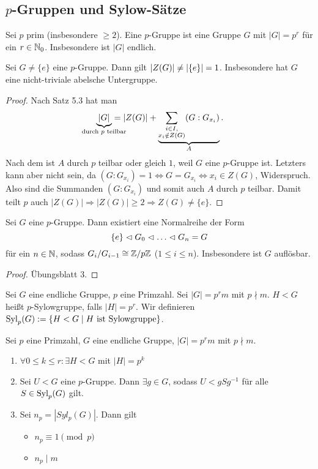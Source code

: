 \documentclass[12pt,a4paper]{scrartcl}
\begin{document}
\subsection{\texorpdfstring{$p$}{p}-Gruppen und Sylow-Sätze}
\begin{defi}
	Sei $p$ prim (insbesondere $\geq 2$). Eine $p$-Gruppe ist eine Gruppe $G$ mit $|G| = p^r$ für ein $r\in\IN_0$. Insbesondere ist $|G|$ endlich.
\end{defi}
\begin{satz}
	Sei $G\neq\{e\}$ eine $p$-Gruppe. Dann gilt $\abs{Z(G)}\neq \abs*{\{e\}} = 1$. Insbesondere hat $G$ eine nicht-triviale abelsche Untergruppe.
\end{satz}
\begin{proof}
	Nach Satz 5.3 hat man \[ \underbrace{|G|}_{\mathclap{\text{durch $p$ teilbar}}}  = |Z(G)| + \underbrace{\sum_{\substack{i\in I,\\x_i\notin Z(G)}}(G: G_{x_i})}_{A}.\] Nach dem  ist $A$ durch $p$ teilbar oder gleich $1$, weil $G$ eine $p$-Gruppe ist. Letzters kann aber nicht sein, da $(G:G_{x_i}) = 1 \Leftrightarrow G = G_{x_i}\Leftrightarrow x_i\in Z(G)$, Widerspruch. Also sind die Summanden $(G:G_{x_i})$ und somit auch $A$ durch $p$ teilbar. Damit teilt $p$ auch $|Z(G)|\Rightarrow |Z(G)|\geq 2\Rightarrow Z(G)\neq \{e\}$.
\end{proof}

\begin{satz}
	Sei $G$ eine $p$-Gruppe. Dann existiert eine Normalreihe der Form
	$$ \{e\}\nt G_0\nt\dots\nt G_n = G$$ für ein $n\in\IN$, sodass $G_i/G_{i-1}\cong \IZ/p\IZ$ \textup($1\le i\le n$\textup).
	Insbesondere ist $G$ auflösbar.
\end{satz}
\begin{proof}
	Übungsblatt 3.
\end{proof}

\begin{defi}
	Sei $G$ eine endliche Gruppe, $p$ eine Primzahl. Sei $|G| = p^rm$ mit $p\nmid m$. $H<G$ heißt $p$-Sylowgruppe, falls $|H| = p^r$. Wir definieren  $\Syl_p(G):=\{H<G\mid H\text{ ist Sylowgruppe}\}$.
\end{defi}

\begin{satz}[Sylowsätze] \label{thm:sylow}
	Sei $p$ eine Primzahl, $G$ eine endliche Gruppe, $|G| = p^rm$ mit $p\nmid m$.\begin{enumerate}
		\item $\forall 0\le k\le r \colon\exists H<G$ mit $|H| = p^k$
		\item Sei $U<G$ eine $p$-Gruppe. Dann $\exists g\in G$, sodass $U<gSg^{-1}$ für alle $S\in \Syl_p(G)$ gilt.
		\item Sei $n_p = |Syl_p(G)|$. Dann gilt \begin{itemize}
			\item $n_p\equiv 1\pmod p$
			\item $n_p\mid m$
		\end{itemize}
	\end{enumerate}
\end{satz}
\end{document}
